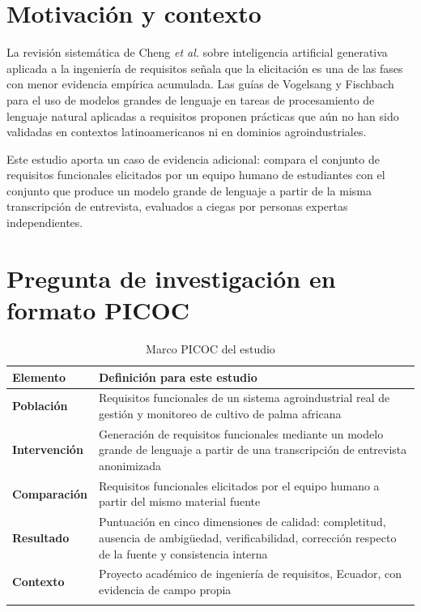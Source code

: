 \documentclass[11pt,a4paper]{article}
\begin{document}
\section{Motivación y contexto}

La revisión sistemática de Cheng \emph{et al.} sobre inteligencia artificial generativa aplicada a
la ingeniería de requisitos señala que la elicitación es una de las fases con menor evidencia
empírica acumulada. Las guías de Vogelsang y Fischbach para el uso de modelos grandes de lenguaje en
tareas de procesamiento de lenguaje natural aplicadas a requisitos proponen prácticas que aún no han
sido validadas en contextos latinoamericanos ni en dominios agroindustriales.

Este estudio aporta un caso de evidencia adicional: compara el conjunto de requisitos funcionales
elicitados por un equipo humano de estudiantes con el conjunto que produce un modelo grande de
lenguaje a partir de la misma transcripción de entrevista, evaluados a ciegas por personas expertas
independientes.

\section{Pregunta de investigación en formato PICOC}

\begin{longtable}{|C{2.6cm}|L{12.2cm}|}
\hline
{}\textbf{Elemento} & \textbf{Definición para este estudio} \\
\hline
\endhead
\textbf{Población} & Requisitos funcionales de un sistema agroindustrial real de gestión y monitoreo de cultivo de palma africana \\ \hline
\textbf{Intervención} & Generación de requisitos funcionales mediante un modelo grande de lenguaje a partir de una transcripción de entrevista anonimizada \\ \hline
\textbf{Comparación} & Requisitos funcionales elicitados por el equipo humano a partir del mismo material fuente \\ \hline
\textbf{Resultado} & Puntuación en cinco dimensiones de calidad: completitud, ausencia de ambigüedad, verificabilidad, corrección respecto de la fuente y consistencia interna \\ \hline
\textbf{Contexto} & Proyecto académico de ingeniería de requisitos, Ecuador, con evidencia de campo propia \\ \hline
\caption{Marco PICOC del estudio}
\end{longtable}
\end{document}
